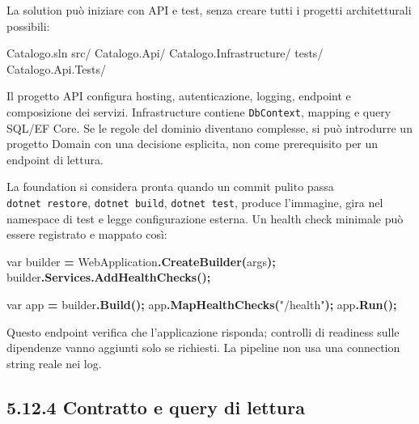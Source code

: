 \documentclass[
  italian,
  10pt,
]{book}
\newenvironment{Shaded}{\begin{snugshade}}{\end{snugshade}}
\newcommand{\DataTypeTok}[1]{\textcolor[rgb]{0.13,0.29,0.53}{#1}}
\newcommand{\FunctionTok}[1]{\textcolor[rgb]{0.13,0.29,0.53}{\textbf{#1}}}
\newcommand{\NormalTok}[1]{#1}
\newcommand{\OperatorTok}[1]{\textcolor[rgb]{0.81,0.36,0.00}{\textbf{#1}}}
\newcommand{\StringTok}[1]{\textcolor[rgb]{0.31,0.60,0.02}{#1}}
\begin{document}
La solution può iniziare con API e test, senza creare tutti i progetti
architetturali possibili:

\begin{Shaded}
\begin{Highlighting}[]
\NormalTok{Catalogo.sln}
\NormalTok{src/}
\NormalTok{  Catalogo.Api/}
\NormalTok{  Catalogo.Infrastructure/}
\NormalTok{tests/}
\NormalTok{  Catalogo.Api.Tests/}
\end{Highlighting}
\end{Shaded}

Il progetto API configura hosting, autenticazione, logging, endpoint e
composizione dei servizi. Infrastructure contiene \texttt{DbContext},
mapping e query SQL/EF Core. Se le regole del dominio diventano
complesse, si può introdurre un progetto Domain con una decisione
esplicita, non come prerequisito per un endpoint di lettura.

La foundation si considera pronta quando un commit pulito passa
\texttt{dotnet\ restore}, \texttt{dotnet\ build}, \texttt{dotnet\ test},
produce l'immagine, gira nel namespace di test e legge configurazione
esterna. Un health check minimale può essere registrato e mappato così:

\begin{Shaded}
\begin{Highlighting}[]
\DataTypeTok{var}\NormalTok{ builder }\OperatorTok{=}\NormalTok{ WebApplication}\OperatorTok{.}\FunctionTok{CreateBuilder}\OperatorTok{(}\NormalTok{args}\OperatorTok{);}
\NormalTok{builder}\OperatorTok{.}\FunctionTok{Services}\OperatorTok{.}\FunctionTok{AddHealthChecks}\OperatorTok{();}

\DataTypeTok{var}\NormalTok{ app }\OperatorTok{=}\NormalTok{ builder}\OperatorTok{.}\FunctionTok{Build}\OperatorTok{();}
\NormalTok{app}\OperatorTok{.}\FunctionTok{MapHealthChecks}\OperatorTok{(}\StringTok{"/health"}\OperatorTok{);}
\NormalTok{app}\OperatorTok{.}\FunctionTok{Run}\OperatorTok{();}
\end{Highlighting}
\end{Shaded}

Questo endpoint verifica che l'applicazione risponda; controlli di
readiness sulle dipendenze vanno aggiunti solo se richiesti. La pipeline
non usa una connection string reale nei log.

\subsection{5.12.4 Contratto e query di
lettura}\label{contratto-e-query-di-lettura}
\end{document}
